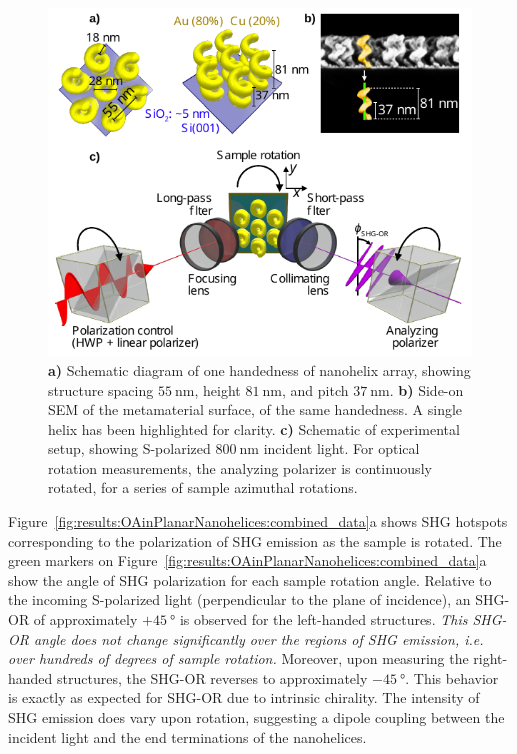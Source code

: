 \begin{figure}[htb!]	
    \centering	
    \includegraphics[scale=1.0]{./figures/results/OAinPlanarNanohelices/setup.pdf}
    \caption{\label{fig:results:OAinPlanarNanohelices:setup}
    \textbf{a)} Schematic diagram of one handedness of nanohelix array, showing structure spacing $\SI{55}{\nano\m}$, height $\SI{81}{\nano\m}$, and pitch $\SI{37}{\nano\m}$. \textbf{b)} Side-on SEM of the metamaterial surface, of the same handedness. A single helix has been highlighted for clarity. \textbf{c)} Schematic of experimental setup, showing S-polarized $\SI{800}{\nano\m}$ incident light. For optical rotation measurements, the analyzing polarizer is continuously rotated, for a series of sample azimuthal rotations.}	
\end{figure}

Figure~\ref{fig:results:OAinPlanarNanohelices:combined_data}a shows SHG hotspots corresponding to the polarization of SHG emission as the sample is rotated. The green markers on Figure~\ref{fig:results:OAinPlanarNanohelices:combined_data}a show the angle of SHG polarization for each sample rotation angle. Relative to the incoming S-polarized light (perpendicular to the plane of incidence), an SHG-OR of approximately $+\SI{45}{\degree}$ is observed for the left-handed structures. \textit{This SHG-OR angle does not change significantly over the regions of SHG emission, i.e. over hundreds of degrees of sample rotation.} 
Moreover, upon measuring the right-handed structures, the SHG-OR reverses to approximately $-\SI{45}{\degree}$. This behavior is exactly as expected for SHG-OR due to intrinsic chirality. The intensity of SHG emission does vary upon rotation, suggesting a dipole coupling between the incident light and the end terminations of the nanohelices. 

